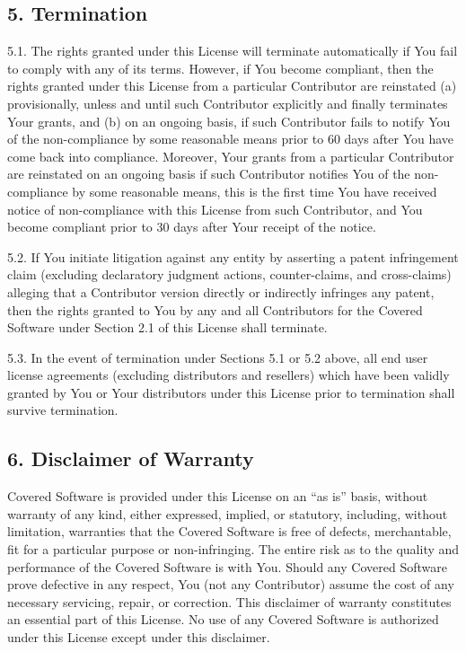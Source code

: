 \documentclass[letterpaper,10pt,english]{sphinxmanual}
\begin{document}
\subsection{5. Termination}
\label{\detokenize{warranty:termination}}
5.1. The rights granted under this License will terminate automatically
if You fail to comply with any of its terms. However, if You become
compliant, then the rights granted under this License from a particular
Contributor are reinstated (a) provisionally, unless and until such
Contributor explicitly and finally terminates Your grants, and (b) on an
ongoing basis, if such Contributor fails to notify You of the
non-compliance by some reasonable means prior to 60 days after You have
come back into compliance. Moreover, Your grants from a particular
Contributor are reinstated on an ongoing basis if such Contributor
notifies You of the non-compliance by some reasonable means, this is the
first time You have received notice of non-compliance with this License
from such Contributor, and You become compliant prior to 30 days after
Your receipt of the notice.

5.2. If You initiate litigation against any entity by asserting a patent
infringement claim (excluding declaratory judgment actions,
counter-claims, and cross-claims) alleging that a Contributor version
directly or indirectly infringes any patent, then the rights granted to
You by any and all Contributors for the Covered Software under Section
2.1 of this License shall terminate.

5.3. In the event of termination under Sections 5.1 or 5.2 above, all
end user license agreements (excluding distributors and resellers) which
have been validly granted by You or Your distributors under this License
prior to termination shall survive termination.


\subsection{6. Disclaimer of Warranty}
\label{\detokenize{warranty:disclaimer-of-warranty}}
Covered Software is provided under this License on an “as is” basis, without warranty of any kind, either expressed, implied, or statutory, including, without limitation, warranties that the Covered Software is free of defects, merchantable, fit for a particular purpose or non-infringing. The entire risk as to the quality and performance of the Covered Software is with You. Should any Covered Software prove defective in any respect, You (not any Contributor) assume the cost of any necessary servicing, repair, or correction. This disclaimer of warranty constitutes an essential part of this License. No use of any Covered Software is authorized under this License except under this disclaimer.
\end{document}
